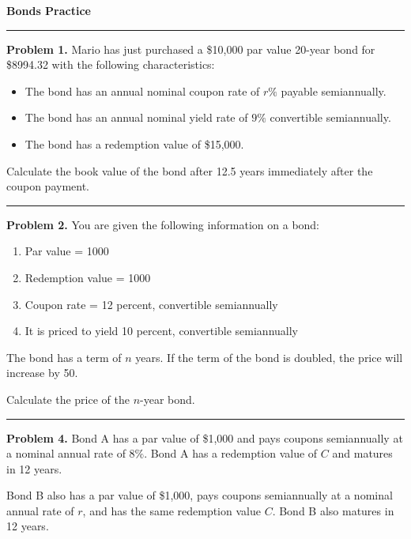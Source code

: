 \documentclass[11pt]{article}
\begin{document}
\begin{center}
    {\Large \textbf{Bonds Practice}}\\
\end{center}

\vspace{10pt}

\hrule

\medskip

\textbf{Problem 1.} Mario has just purchased a \$10{,}000 par value 20-year bond for \$8994.32 with the following characteristics:

\begin{itemize}
    \item The bond has an annual nominal coupon rate of \(r\%\) payable semiannually.
    \item The bond has an annual nominal yield rate of \(9\%\) convertible semiannually.
    \item The bond has a redemption value of \$15{,}000.
\end{itemize}

Calculate the book value of the bond after 12.5 years immediately after the coupon payment.

\medskip
\hrule


\textbf{Problem 2.} You are given the following information on a bond:

\begin{enumerate}[label=\roman*.]
    \item Par value = 1000
    \item Redemption value = 1000
    \item Coupon rate = 12 percent, convertible semiannually
    \item It is priced to yield 10 percent, convertible semiannually
\end{enumerate}

The bond has a term of \(n\) years. If the term of the bond is doubled, the price will increase by 50.

Calculate the price of the \(n\)-year bond.

\medskip
\hrule


\textbf{Problem 4.} Bond A has a par value of \$1{,}000 and pays coupons semiannually at a nominal annual rate of \(8\%\). Bond A has a redemption value of \(C\) and matures in 12 years.

Bond B also has a par value of \$1{,}000, pays coupons semiannually at a nominal annual rate of \(r\), and has the same redemption value \(C\). Bond B also matures in 12 years.
\end{document}
